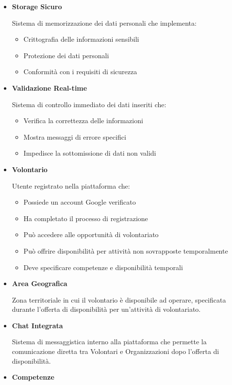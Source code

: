\begin{itemize}
\item \textbf{Storage Sicuro}

Sistema di memorizzazione dei dati personali che implementa:
\begin{itemize}
    \item Crittografia delle informazioni sensibili
    \item Protezione dei dati personali
    \item Conformità con i requisiti di sicurezza
\end{itemize}

\item \textbf{Validazione Real-time}

Sistema di controllo immediato dei dati inseriti che:
\begin{itemize}
    \item Verifica la correttezza delle informazioni
    \item Mostra messaggi di errore specifici
    \item Impedisce la sottomissione di dati non validi
\end{itemize}

\item \textbf{Volontario}

Utente registrato nella piattaforma che:
\begin{itemize}
    \item Possiede un account Google verificato
    \item Ha completato il processo di registrazione
    \item Può accedere alle opportunità di volontariato
    \item Può offrire disponibilità per attività non sovrapposte temporalmente
    \item Deve specificare competenze e disponibilità temporali
\end{itemize}

\item \textbf{Area Geografica}

Zona territoriale in cui il volontario è disponibile ad operare, specificata durante l'offerta di disponibilità per un'attività di volontariato.

\item \textbf{Chat Integrata}

Sistema di messaggistica interno alla piattaforma che permette la comunicazione diretta tra Volontari e Organizzazioni dopo l'offerta di disponibilità.

\item \textbf{Competenze}


\end{itemize}
